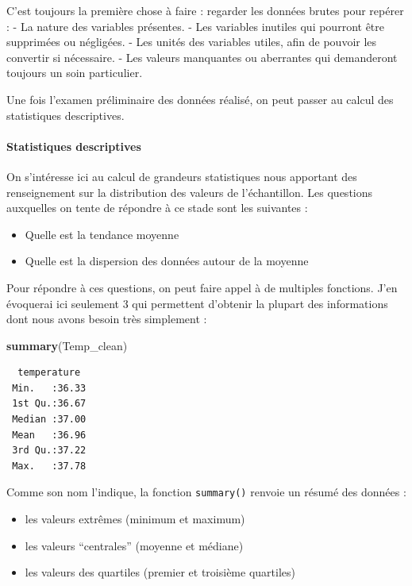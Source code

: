 \documentclass[a4paperpaper,]{article}
\newenvironment{Shaded}{\begin{snugshade}}{\end{snugshade}}
\newcommand{\KeywordTok}[1]{\textcolor[rgb]{0.12,0.11,0.11}{\textbf{#1}}}
\newcommand{\NormalTok}[1]{\textcolor[rgb]{0.12,0.11,0.11}{#1}}
\providecommand{\tightlist}{%
  \setlength{\itemsep}{0pt}\setlength{\parskip}{0pt}}
\let\oldparagraph\paragraph
\renewcommand{\paragraph}[1]{\oldparagraph{#1}\mbox{}}
\begin{document}
C'est toujours la première chose à faire : regarder les données brutes pour repérer :
- La nature des variables présentes.
- Les variables inutiles qui pourront être supprimées ou négligées.
- Les unités des variables utiles, afin de pouvoir les convertir si nécessaire.
- Les valeurs manquantes ou aberrantes qui demanderont toujours un soin particulier.

Une fois l'examen préliminaire des données réalisé, on peut passer au calcul des statistiques descriptives.

\hypertarget{statistiques-descriptives}{%
\paragraph{Statistiques descriptives}\label{statistiques-descriptives}}

On s'intéresse ici au calcul de grandeurs statistiques nous apportant des renseignement sur la distribution des valeurs de l'échantillon. Les questions auxquelles on tente de répondre à ce stade sont les suivantes :

\begin{itemize}
\tightlist
\item
  Quelle est la tendance moyenne
\item
  Quelle est la dispersion des données autour de la moyenne
\end{itemize}

Pour répondre à ces questions, on peut faire appel à de multiples fonctions. J'en évoquerai ici seulement 3 qui permettent d'obtenir la plupart des informations dont nous avons besoin très simplement :

\begin{Shaded}
\begin{Highlighting}[]
\KeywordTok{summary}\NormalTok{(Temp_clean)}
\end{Highlighting}
\end{Shaded}

\begin{verbatim}
  temperature   
 Min.   :36.33  
 1st Qu.:36.67  
 Median :37.00  
 Mean   :36.96  
 3rd Qu.:37.22  
 Max.   :37.78  
\end{verbatim}

Comme son nom l'indique, la fonction \texttt{summary()} renvoie un résumé des données :

\begin{itemize}
\tightlist
\item
  les valeurs extrêmes (minimum et maximum)
\item
  les valeurs ``centrales'' (moyenne et médiane)
\item
  les valeurs des quartiles (premier et troisième quartiles)
\end{itemize}
\end{document}
